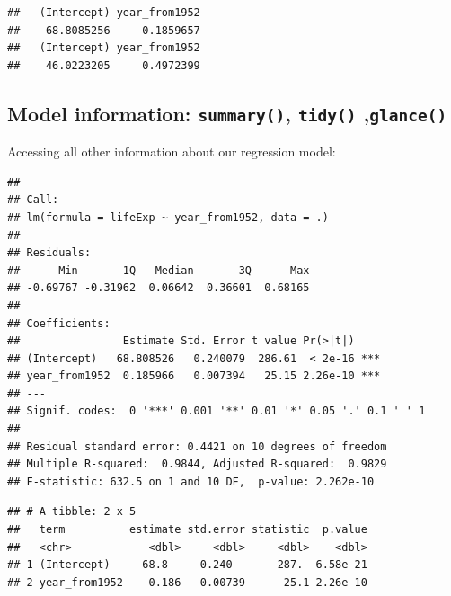 \documentclass[]{book}
\makeatletter
\newenvironment{Shaded}{\begin{snugshade}}{\end{snugshade}}
\newcommand{\KeywordTok}[1]{\textcolor[rgb]{0.13,0.29,0.53}{\textbf{#1}}}
\newcommand{\NormalTok}[1]{#1}
\newcommand{\OperatorTok}[1]{\textcolor[rgb]{0.81,0.36,0.00}{\textbf{#1}}}
\newcommand{\StringTok}[1]{\textcolor[rgb]{0.31,0.60,0.02}{#1}}
\newenvironment{kframe}{%
\medskip{}
\setlength{\fboxsep}{.8em}
 \def\at@end@of@kframe{}%
 \ifinner\ifhmode%
  \def\at@end@of@kframe{\end{minipage}}%
  \begin{minipage}{\columnwidth}%
 \fi\fi%
 \def\FrameCommand##1{\hskip\@totalleftmargin \hskip-\fboxsep
 \colorbox{shadecolor}{##1}\hskip-\fboxsep
     \hskip-\linewidth \hskip-\@totalleftmargin \hskip\columnwidth}%
 \MakeFramed {\advance\hsize-\width
   \@totalleftmargin\z@ \linewidth\hsize
   \@setminipage}}%
 {\par\unskip\endMakeFramed%
 \at@end@of@kframe}
\renewenvironment{Shaded}{\begin{kframe}}{\end{kframe}}
\theoremstyle{definition}
\theoremstyle{definition}
\theoremstyle{definition}
\theoremstyle{remark}
\makeatother
\begin{document}
\begin{verbatim}
##   (Intercept) year_from1952 
##    68.8085256     0.1859657 
##   (Intercept) year_from1952 
##    46.0223205     0.4972399
\end{verbatim}

\hypertarget{model-information-summary-tidy-glance}{%
\subsection{\texorpdfstring{Model information: \texttt{summary()},
\texttt{tidy()}
,\texttt{glance()}}{Model information: summary(), tidy() ,glance()}}\label{model-information-summary-tidy-glance}}

Accessing all other information about our regression model:

\begin{Shaded}
\end{Shaded}

\begin{verbatim}
## 
## Call:
## lm(formula = lifeExp ~ year_from1952, data = .)
## 
## Residuals:
##      Min       1Q   Median       3Q      Max 
## -0.69767 -0.31962  0.06642  0.36601  0.68165 
## 
## Coefficients:
##                Estimate Std. Error t value Pr(>|t|)    
## (Intercept)   68.808526   0.240079  286.61  < 2e-16 ***
## year_from1952  0.185966   0.007394   25.15 2.26e-10 ***
## ---
## Signif. codes:  0 '***' 0.001 '**' 0.01 '*' 0.05 '.' 0.1 ' ' 1
## 
## Residual standard error: 0.4421 on 10 degrees of freedom
## Multiple R-squared:  0.9844, Adjusted R-squared:  0.9829 
## F-statistic: 632.5 on 1 and 10 DF,  p-value: 2.262e-10
\end{verbatim}

\begin{Shaded}
\end{Shaded}

\begin{verbatim}
## # A tibble: 2 x 5
##   term          estimate std.error statistic  p.value
##   <chr>            <dbl>     <dbl>     <dbl>    <dbl>
## 1 (Intercept)     68.8     0.240       287.  6.58e-21
## 2 year_from1952    0.186   0.00739      25.1 2.26e-10
\end{verbatim}
\end{document}
